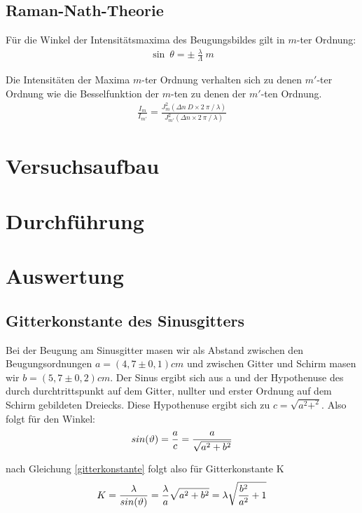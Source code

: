 \documentclass[12pt]{article}
\begin{document}
\subsection{Raman-Nath-Theorie}
Für die Winkel der Intensitätsmaxima des Beugungsbildes gilt in $m$-ter Ordnung:
\begin{align}
 \sin~\theta = \pm~\frac{\lambda}{\Lambda}~m
\end{align}

Die Intensitäten der Maxima $m$-ter Ordnung verhalten sich zu denen $m'$-ter Ordnung wie die Besselfunktion der $m$-ten zu denen der $m'$-ten Ordnung.
\begin{align}
 \frac{I_m}{I_{m'}} = \frac{J^2_m(\Delta n~D \times 2~\pi~/~\lambda)}{J^2_{m'}(\Delta n \times 2~\pi~/~\lambda)}
\end{align}

\section{Versuchsaufbau}

\section{Durchführung}

\section{Auswertung}
\subsection{Gitterkonstante des Sinusgitters}
Bei der Beugung am Sinusgitter masen wir als Abstand zwischen den Beugungsordnungen $a=(4,7 \pm 0,1)cm$ und zwischen Gitter und Schirm masen wir $b=(5,7\pm0,2)cm$. Der Sinus ergibt sich aus a und der Hypothenuse des durch durchtrittspunkt auf dem Gitter, nullter und erster Ordnung auf dem Schirm gebildeten Dreiecks. Diese Hypothenuse ergibt sich zu $c=\sqrt{a^2+^2}$. Also folgt für den Winkel:
\begin{align}
\notag
 sin(\vartheta)=\frac{a}{c}=\frac{a}{\sqrt{a^2+b^2}}
\end{align}

nach Gleichung \ref{gitterkonstante} folgt also für Gitterkonstante K
\begin{align}
\notag
 K=\frac{\lambda}{sin(\vartheta)}=\frac{\lambda}{a}\sqrt{a^2+b^2}= \lambda\sqrt{\frac{b^2}{a^2}+1}
\end{align}
\end{document}
